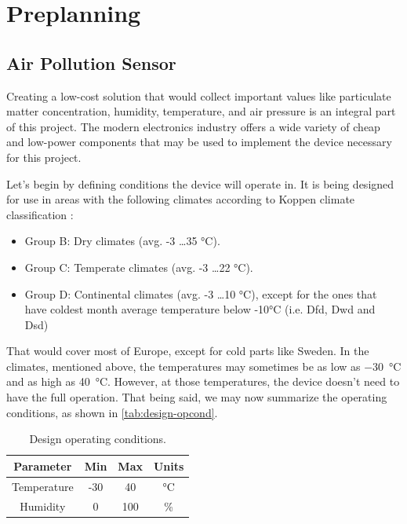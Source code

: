 \documentclass{article}
\begin{document}
	\section{Preplanning}	
	
		\subsection{Air Pollution Sensor}
		
			Creating a low-cost solution that would collect important values like particulate matter concentration, humidity, temperature, and air pressure is an integral part of this project. The modern electronics industry offers a wide variety of cheap and low-power components that may be used to implement the device necessary for this project.
			
			Let's begin by defining conditions the device will operate in. It is being designed for use in areas with the following climates according to Koppen climate classification \cite{website:wiki:koppen}:
			\begin{itemize}
				\item Group B: Dry climates (avg. -3 \ldots 35 \si{\celsius}).
				\item Group C: Temperate climates (avg. -3 \ldots 22 \si{\celsius}).
				\item Group D: Continental climates  (avg. -3 \ldots 10 \si{\celsius}), except for the ones that have coldest month average temperature below -10\si{\celsius} (i.e. Dfd, Dwd and Dsd)
			\end{itemize}
			
			That would cover most of Europe, except for cold parts like Sweden. In the climates, mentioned above, the temperatures may sometimes be as low as \SI{-30}{\celsius} and as high as \SI{40}{\celsius}. However, at those temperatures, the device doesn't need to have the full operation. That being said, we may now summarize the operating conditions, as shown in \autoref{tab:design-opcond}.
			
			\begin{table}[h]
				\begin{center}
					\caption{Design operating conditions.}
					\label{tab:design-opcond}
					\begin{tabular}{c|c|c|c}
						\textbf{Parameter} & \textbf{Min} & \textbf{Max} & \textbf{Units} \\
						\hline
						
						Temperature & -30 & 40 & \si{\celsius} \\
						Humidity & 0 & 100 & \% \\
					
					\end{tabular}
				\end{center}
			\end{table}
			
\end{document}
